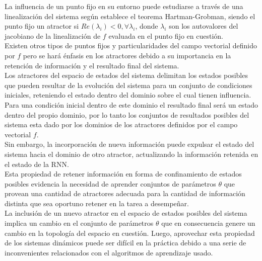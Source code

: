 \documentclass{article}
\begin{document}
	La influencia de un punto fijo en su entorno puede estudiarse a través de una linealización del sistema según establece el teorema Hartman-Grobman, siendo el punto fijo un atractor si $Re(\lambda_i)<0, \forall \lambda_i$, donde $\lambda_i$ son los autovalores del jacobiano de la linealización de $f$ evaluada en el punto fijo en cuestión.\\
	
	Existen otros tipos de puntos fijos y particularidades del campo vectorial definido por $f$ pero se hará énfasis en los atractores debido a su importancia en la retención de información y el resultado final del sistema.\\
	
	Los atractores del espacio de estados del sistema delimitan los estados posibles que pueden resultar de la evolución del sistema para un conjunto de condiciones iniciales, reteniendo el estado dentro del dominio sobre el cual tienen influencia. \\
	Para una condición inicial dentro de este dominio el resultado final será un estado dentro del propio dominio, por lo tanto los conjuntos de resultados posibles del sistema esta dado por los dominios de los atractores definidos por el campo vectorial $f$. \\
	Sin embargo, la incorporación de nueva información puede expulsar el estado del sistema hacia el dominio de otro atractor, actualizando la información retenida en el estado de la RNN.\\
	
	Esta propiedad de retener información en forma de confinamiento de estados posibles evidencia la necesidad de aprender conjuntos de parámetros $\theta$ que provean una cantidad de atractores adecuada para la cantidad de información distinta que sea oportuno retener en la tarea a desempeñar. \\
	La inclusión de un nuevo atractor en el espacio de estados posibles del sistema implica un cambio en el conjunto de parámetros $\theta$ que en consecuencia genere un cambio en la topología del espacio en cuestión.
	Luego, aprovechar esta propiedad de los sistemas dinámicos puede ser difícil en la práctica debido a una serie de inconvenientes relacionados con el algoritmos de aprendizaje usado.\\
	
\end{document}
